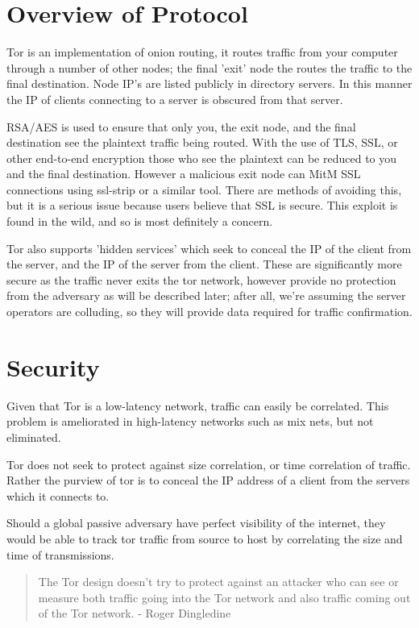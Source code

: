 \section{Overview of Protocol}
Tor is an implementation of onion routing, it routes traffic from your computer
through a number of other nodes; the final 'exit' node the routes the traffic
to the final destination\cite{torProtocol}. Node IP's are listed publicly in
directory servers. In this manner the IP of clients connecting to a server is
obscured from that server.

RSA/AES is used to ensure that only you, the exit node, and the final
destination see the plaintext traffic being routed. With the use of TLS, SSL, or
other end-to-end encryption those who see the plaintext can be reduced to you
and the final destination. However a malicious exit node can MitM SSL connections
using ssl-strip or a similar tool. There are methods of avoiding this, but it is
a serious issue because users believe that SSL is secure. This exploit is found
in the wild\cite{badRelays}, and so is most definitely a concern.

Tor also supports 'hidden services' which seek to conceal the IP of the client
from the server, and the IP of the server from the client. These are
significantly more secure as the traffic never exits the tor network, however
provide no protection from the adversary as will be described later; after all,
we're assuming the server operators are colluding, so they will provide data
required for traffic confirmation.

\section{Security}
Given that Tor is a low-latency network, traffic can easily be correlated. This
problem is ameliorated in high-latency networks such as mix nets, but not
eliminated.

Tor does not seek to protect against size correlation, or time correlation of
traffic. Rather the purview of tor is to conceal the IP address of a client from
the servers which it connects to.

Should a global passive adversary have perfect visibility of the internet, they
would be able to track tor traffic from source to host by correlating the size
and time of transmissions.

\begin{quote}
The Tor design doesn't try to protect against an attacker who can see or measure
both traffic going into the Tor network and also traffic coming out of the Tor
network\cite{torOneCell}. - Roger Dingledine
\end{quote}

